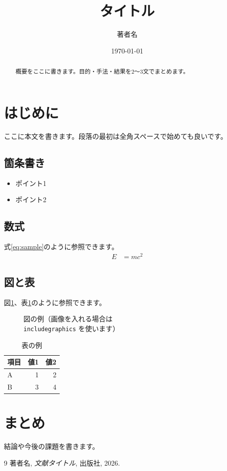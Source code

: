 \documentclass[a4paper,11pt]{ltjsarticle}
\title{タイトル}
\author{著者名}
\date{\today}
\begin{document}
\maketitle

\begin{abstract}
概要をここに書きます。目的・手法・結果を2〜3文でまとめます。
\end{abstract}

\section{はじめに}
ここに本文を書きます。段落の最初は全角スペースで始めても良いです。

\subsection{箇条書き}
\begin{itemize}
  \item ポイント1
  \item ポイント2
\end{itemize}

\subsection{数式}
式\eqref{eq:sample}のように参照できます。
\begin{align}
  E &= mc^2 \label{eq:sample}
\end{align}

\subsection{図と表}
図\ref{fig:sample}、表\ref{tab:sample}のように参照できます。
\begin{figure}[t]
  \centering
  \fbox{\rule{0pt}{120pt}\rule{0.9\linewidth}{0pt}}
  \caption{図の例（画像を入れる場合は \texttt{\\includegraphics} を使います）}
  \label{fig:sample}
\end{figure}

\begin{table}[t]
  \centering
  \caption{表の例}
  \label{tab:sample}
  \begin{tabular}{lrr}
    \hline
    項目 & 値1 & 値2 \\
    \hline
    A & 1 & 2 \\
    B & 3 & 4 \\
    \hline
  \end{tabular}
\end{table}

\section{まとめ}
結論や今後の課題を書きます。

\begin{thebibliography}{9}
    著者名, \emph{文献タイトル}, 出版社, 2026.
\end{thebibliography}
\end{document}
